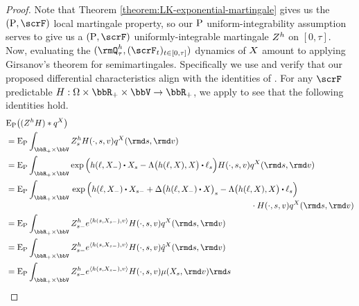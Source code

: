 \begin{proof}
  \label{proof:theorem:LK-girsanov}
  Note that Theorem \ref{theorem:LK-exponential-martingale} gives us the $(\Prb, \scrF)$ local martingale property, so our ${\operatorname{P}}$ uniform-integrability assumption serves to give us a $(\Prb, \scrF)$ uniformly-integrable martingale $Z^h$ on $[0,\tau]$.
  Now, evaluating the $(\mgPrb^\twistFunc_\tau, (\scrF_t)_{t\in[0,\tau]})$ dynamics of $X$ amount to applying Girsanov's theorem for semimartingales.
  Specifically we use \cite[Theorem III.3.24]{jacod2003} and verify that our proposed differential characteristics align with the identities of \cite[III.3.28]{jacod2003}.
  For any $\scrF$ predictable $H: \Omega \times \bbR_+ \times \vecSpace \rightarrow \bbR_+$, we apply \cite[Remark I.4.36]{jacod2003} to see that the following identities hold.
  \begin{align*}
    &\Exp_\Prb \big( (\mgDensity^\twistFunc H) \ast \jumpMeas^\X \big) \\
    &= \Exp_\Prb \int_{\bbR_+ \times \vecSpace} \mgDensity^\twistFunc_s H(\cdot, s, \markVar) \jumpMeas^\X(\rmd s, \rmd\markVar) \\
    &= \Exp_\Prb \int_{\bbR_+ \times \vecSpace} \exp\Big( \twistFunc(\leb, \X_-) \shortInt \X_s - \ode\big( \twistFunc(\leb, \X), \X \big) \shortInt \leb_s \Big) H(\cdot, s, \markVar) \jumpMeas^\X(\rmd s, \rmd\markVar) \\
    &= \Exp_\Prb \int_{\bbR_+ \times \vecSpace} \begin{aligned}[t]
      &\exp\Big( \twistFunc(\leb, \X_-) \shortInt \X_{s-} + \Delta\big(\twistFunc(\leb, \X_-) \shortInt \X\big)_s - \ode\big( \twistFunc(\leb, \X), \X \big) \shortInt \leb_s \Big)  \\
      &\hspace{75mm} \cdot H(\cdot, s, \markVar) \jumpMeas^\X(\rmd s, \rmd\markVar) 
    \end{aligned} \\
    &= \Exp_\Prb \int_{\bbR_+ \times \vecSpace} \mgDensity^\twistFunc_{s-} e^\prj{\twistFunc(s, \X_{s-})}{\markVar} H(\cdot, s, \markVar) \jumpMeas^\X(\rmd s, \rmd\markVar)  \\
    &= \Exp_\Prb \int_{\bbR_+ \times \vecSpace} \mgDensity^\twistFunc_{s-} e^\prj{\twistFunc(s, \X_{s-})}{\markVar} H(\cdot, s, \markVar) \predproj{\jumpMeas^\X}(\rmd s, \rmd\markVar)  \\
    &= \Exp_\Prb \int_{\bbR_+ \times \vecSpace} \mgDensity^\twistFunc_{s-} e^\prj{\twistFunc(s, \X_{s-})}{\markVar} H(\cdot, s, \markVar) \affJump(\X_s, \rmd\markVar) \rmd s  \\

\end{align*}
\end{proof}

